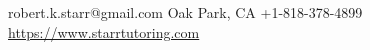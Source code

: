 \documentclass[lighthipster]{simplehipstercv}
\newlength{\rightcolwidth}
\begin{document}
\begin{paracol}{2}
\begin{minipage}[t]{0.3\textwidth}


\end{minipage}






\vfill{} %

\setlength{\parindent}{0pt}
\begin{minipage}[t]{\rightcolwidth}
    \begin{center}\fontfamily{\sfdefault}\selectfont \color{black!70}
    {\small{} robert.k.starr@gmail.com
     Oak Park, CA 
    +1-818-378-4899 
    \newline{}
    \protect\url{https://www.starrtutoring.com} 
    }
    \end{center}
    \end{minipage}

\end{paracol}
\end{document}
